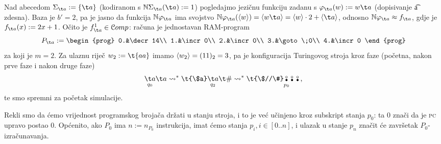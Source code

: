 \begin{primjer}\label{pr:+a}
Nad abecedom $\Sigma_{\t a}:=\{\t a\}$ (kodiranom s $\N\Sigma_{\t a}(\t a):=1$) pogledajmo jezičnu funkciju zadanu s $\varphi_{\t a}(w):=w\t a$ (dopisivanje \t a zdesna). Baza je $b'=2$, pa je jasno da funkcija $\N\varphi_{\t a}$ ima svojstvo $\N\varphi_{\t a}(\kr w)=\kr{w\t a}=\kr w\cdot2+\kr{\t a}$, odnosno $\N\varphi_{\t a}\approx f_{\t a}$, gdje je $f_{\t a}(x):=2x+1$. Očito je $f_{\t a}^1\in\mathcal Comp$: računa je jednostavan RAM-program
\begin{equation}\label{eq:+aprog}
    P_{\t a}:=\begin{prog}
    0.&\decr14\\
    1.&\incr0\\
    2.&\incr0\\
    3.&\goto\;0\\
    4.&\incr0
    \end{prog}
\end{equation}
za koji je $m=2$. Za ulaznu riječ $w_2:=\t{aa}$ imamo $\langle w_2\rangle=(11)_2=3$, pa je konfiguracija Turingovog stroja kroz faze (početna, nakon prve faze i nakon druge faze)
\begin{equation}\label{eq:+afaze}
\renewcommand{\arraystretch}{0.1}
    \underset{\mathclap{q_0}}{\t a}\t a\leadsto^*
    \t{\$a}\underset{\mathclap{q_2}}{\t a}\t\#\leadsto^*
    \t{\$//\#}
    \underset{\mathclap{p_0}}{\begin{array}{@{}c@{}}
    \text\textopenbullet\\
    \text\textbullet
    \end{array}}
    \begin{array}{@{}c@{}}
    \text\textopenbullet\\
    \text\textbullet
    \end{array}
    \begin{array}{@{}c@{}}
    \text\textopenbullet\\
    \text\textbullet
    \end{array}\text,
\end{equation}
te smo spremni za početak simulacije. 
\end{primjer}

Rekli smo da ćemo vrijednost programskog brojača držati u stanju stroja, i to je već učinjeno kroz subskript stanja $p_0$: ta $0$ znači da je \textsc{pc} upravo postao $0$. Općenito, ako $P_0$ ima $n:=n_{P_0}$ instrukcija, imat ćemo stanja $p_i,i\in[0..n]$, i ulazak u stanje $p_n$ značit će završetak $P_0$-izračunavanja.


